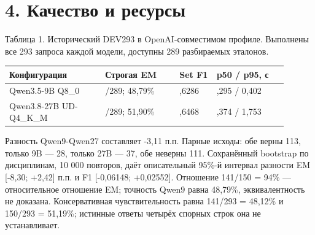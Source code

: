 \documentclass[14pt,a4paper]{extarticle}
\begin{document}
\section*{4. Качество и ресурсы}

\noindent\begin{minipage}{\linewidth}\fontsize{12}{14}\selectfont
Таблица 1. Исторический DEV293 в OpenAI-совместимом профиле. Выполнены все 293 запроса каждой модели, доступны 289 разбираемых эталонов.


\begin{center}\begingroup\fontsize{12}{14}\selectfont\setlength{\tabcolsep}{4pt}
\begin{tabular}{@{}>{\raggedright\arraybackslash}p{0.31\linewidth}>{\raggedright\arraybackslash}p{0.24\linewidth}>{\raggedright\arraybackslash}p{0.12\linewidth}>{\raggedright\arraybackslash}p{0.23\linewidth}@{}}
\toprule
Конфигурация & Строгая EM & Set F1 & p50 / p95, с \\
\midrule
Qwen3.5-9B Q8\_0 & 141/289; 48,79\% & 0,6286 & 0,295 / 0,402 \\
Qwen3.8-27B UD-Q4\_K\_M & 150/289; 51,90\% & 0,6468 & 1,374 / 1,753 \\
\bottomrule\end{tabular}\endgroup\end{center}\end{minipage}

Разность Qwen9-Qwen27 составляет -3,11 п.п. Парные исходы: обе верны 113, только 9B --- 28, только 27B --- 37, обе неверны 111. Сохранённый bootstrap по дисциплинам, 10 000 повторов, даёт описательный 95\%-й интервал разности EM [-8,30; +2,42] п.п. и F1 [-0,06148; +0,02552]. Отношение 141/150 = 94\% --- относительное отношение EM; точность Qwen9 равна 48,79\%, эквивалентность не доказана. Консервативная чувствительность равна 141/293 = 48,12\% и 150/293 = 51,19\%; истинные ответы четырёх спорных строк она не устанавливает.
\end{document}
